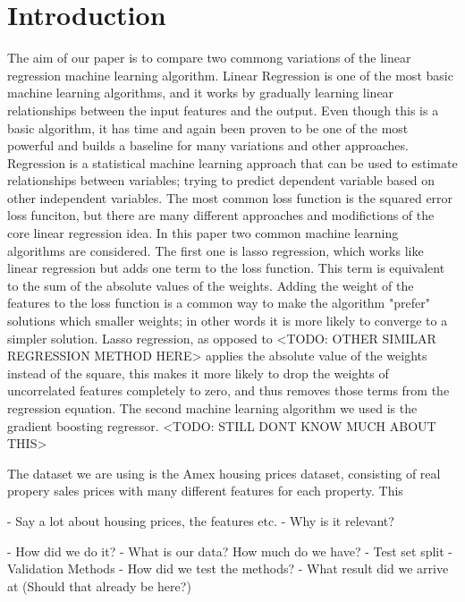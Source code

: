 \section{Introduction}
The aim of our paper is to compare two commong variations of the linear regression machine learning algorithm. Linear Regression is one of the most basic machine learning algorithms, and it works by gradually learning linear relationships between the input features and the output. Even though this is a basic algorithm, it has time and again been proven to be one of the most powerful and builds a baseline for many variations and other approaches.
Regression is a statistical machine learning approach that can be used to estimate relationships between variables; trying to predict dependent variable based on other independent variables. The most common loss function is the squared error loss funciton, but there are many different approaches and modifictions of the core linear regression idea.
In this paper two common machine learning algorithms are considered.
The first one is lasso regression, which works like linear regression but adds one term to the loss function. This term is equivalent to the sum of the absolute values of the weights. Adding the weight of the features to the loss function is a common way to make the algorithm "prefer" solutions which smaller weights; in other words it is more likely to converge to a simpler solution. Lasso regression, as opposed to <TODO: OTHER SIMILAR REGRESSION METHOD HERE> applies the absolute value of the weights instead of the square, this makes it more likely to drop the weights of uncorrelated features completely to zero, and thus removes those terms from the regression equation.
The second machine learning algorithm we used is the gradient boosting regressor.
<TODO: STILL DONT KNOW MUCH ABOUT THIS>

The dataset we are using is the Amex housing prices dataset, consisting of real propery sales prices with many different features for each property. This 

 - Say a lot about housing prices, the features etc.
 - Why is it relevant?

 - How did we do it?
 - What is our data? How much do we have?
 - Test set split
 - Validation Methods
 - How did we test the methods?
 - What result did we arrive at (Should that already be here?)
